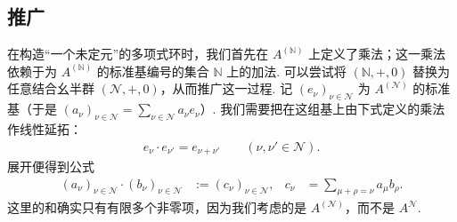 \subsection{推广}\label{sec:galois-1-4-4}
在构造``一个未定元''的多项式环时，我们首先在 $A^{(\mathbb N)}$ 上定义了乘法；这一乘法依赖于为 $A^{(\mathbb N)}$ 的标准基编号的集合 $\mathbb N$ 上的加法. 可以尝试将 $(\mathbb N,+,0)$ 替换为任意结合幺半群 $(\mathcal N,+,0)$，从而推广这一过程. 记 $(e_\nu)_{\nu\in\mathcal N}$ 为 $A^{(\mathcal N)}$ 的标准基（于是 $(a_\nu)_{\nu\in\mathcal N}=\sum_{\nu\in\mathcal N}a_\nu e_\nu$）. 我们需要把在这组基上由下式定义的乘法作线性延拓：
\begin{align*}
e_\nu\cdot e_{\nu'}=e_{\nu+\nu'}\qquad(\nu,\nu'\in\mathcal N).
\end{align*}
展开便得到公式
\begin{align*}
(a_\nu)_{\nu\in\mathcal N}\cdot(b_\nu)_{\nu\in\mathcal N}
&:=(c_\nu)_{\nu\in\mathcal N},&
c_\nu&=\sum_{\mu+\rho=\nu}a_\mu b_\rho.
\end{align*}
这里的和确实只有有限多个非零项，因为我们考虑的是 $A^{(\mathcal N)}$，而不是 $A^{\mathcal N}$.

